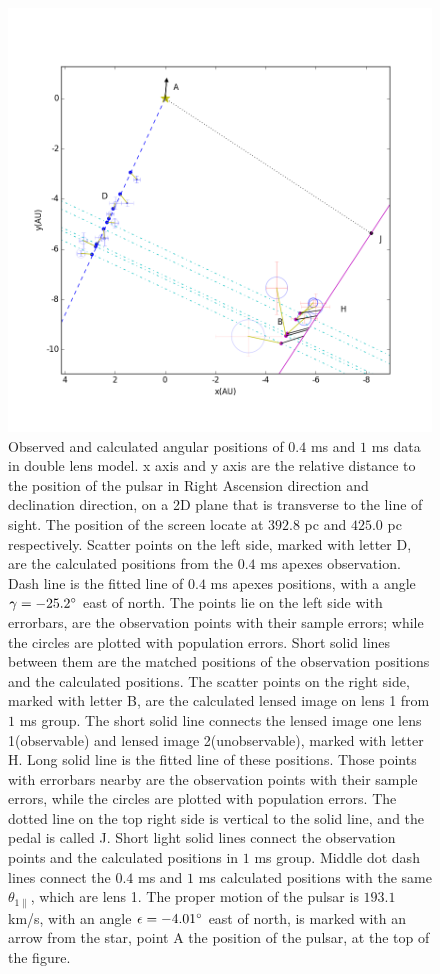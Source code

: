 \documentclass[useAMS,usenatbib]{mn2e}
\begin{document}
\begin{figure}
\centering
\includegraphics[width=1.0\textwidth, angle=0]{Double_lens_xy.png}
\caption{Observed and calculated angular positions of $0.4$ ms and $1$ ms data in double lens model. x axis and y axis are the relative distance to the position of the pulsar in Right Ascension direction and declination direction, on a 2D plane that is transverse to the line of sight. The position of the screen locate at $392.8$ pc and $425.0$ pc respectively. Scatter points on the left side, marked with letter D, are the calculated positions from the $0.4$ ms apexes observation. Dash line is the fitted line of $0.4$ ms apexes positions, with a angle $\gamma=-25.2\degree$  east of north. The points lie on the left side with errorbars, are the observation points with their sample errors; while the circles are plotted with population errors. Short solid lines between them are the matched positions of the observation positions and the calculated positions. The scatter points on the right side, marked with letter B, are the calculated lensed image on lens 1 from $1$ ms group. The short solid line connects the lensed image one lens 1(observable) and lensed image 2(unobservable), marked with letter H. Long solid line is the fitted line of these positions. Those points with errorbars nearby are the observation points with their sample errors, while the circles are plotted with population errors. The dotted line on the top right side is vertical to the solid line, and the pedal is called J. Short light solid lines connect the observation points and the calculated positions in $1$ ms group. Middle dot dash lines connect the $0.4$ ms and $1$ ms calculated positions with the same $\theta_{1\parallel}$, which are lens 1. The proper motion of the pulsar is $193.1$ km/s, with an angle $\epsilon=-4.01\degree$ east of north, is marked with an arrow from the star, point A the position of the pulsar, at the top of the figure.}
\label{Doublelens}
\end{figure}
\end{document}
